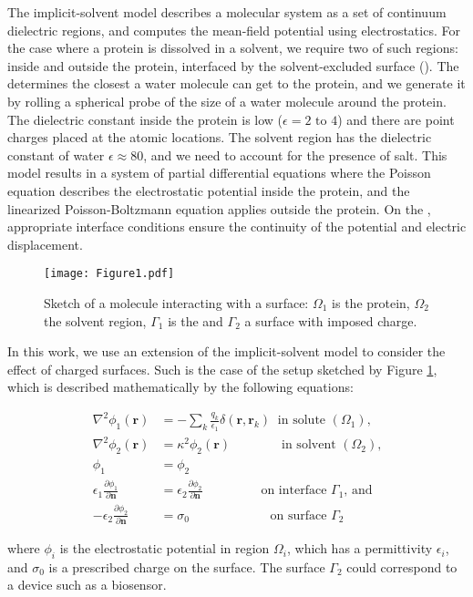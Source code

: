 
The implicit-solvent model describes a molecular system as a set of continuum dielectric regions, and computes the mean-field potential using electrostatics. 
For the case where a protein is dissolved in a solvent, we require two of such regions: inside and outside the protein, interfaced by the solvent-excluded surface (\ses). 
The \ses determines the closest a water molecule can get to the protein, and we generate it by rolling a spherical probe of the size of a water molecule around the protein. 
The dielectric constant inside the protein is low ($\epsilon= 2\text{ to }4$) and there are point charges  placed at the atomic locations. The solvent region has the dielectric constant of water $\epsilon \approx 80$, and we need to account for the presence of salt. 
This model results in a system of partial differential equations where the Poisson equation describes the electrostatic potential inside the protein, and the linearized Poisson-Boltzmann equation applies outside the protein. On the \ses, appropriate interface conditions ensure the continuity of the potential and electric displacement.


\begin{figure}[h]
   \texttt{[image: Figure1.pdf]} 
   \caption{Sketch of a molecule interacting with a surface: $\Omega_1$ is the protein, $\Omega_2$ the solvent region, $\Gamma_1$ is the  \ses and $\Gamma_2$ a surface with imposed charge.}
   \label{fig:molecule_surface}
\end{figure}

In this work, we use an extension of the implicit-solvent model to consider the effect of charged surfaces. Such is the case of the setup sketched by Figure \ref{fig:molecule_surface}, which is described mathematically by the following equations:


\begin{align} \label{eq:pde}
\nabla^2 \phi_1(\mathbf{r}) &= - \sum_k \frac{q_k}{\epsilon_1} \delta(\mathbf{r},\mathbf{r}_k) \ \text{ in solute $(\Omega_1)$,}  \nonumber \\ 
\nabla^2\phi_2 (\mathbf{r}) &= \kappa^2 \phi_2(\mathbf{r}) \quad \qquad \ \ \ \text{ in solvent $(\Omega_2)$,}  \nonumber \\ 
\phi_1 &=\phi_2 \nonumber \\ 
\epsilon_1 \frac{\partial \phi_1}{\partial \mathbf{n}} &= \epsilon_2 \frac{\partial \phi_2}{\partial \mathbf{n}}  \ \qquad \qquad \text{ on interface $\Gamma_1$, and} \nonumber \\
-\epsilon_2 \frac{\partial \phi_2}{\partial \mathbf{n}} &= \sigma_0 \qquad \qquad \qquad \text{ on surface $\Gamma_2$} 
\end{align}

\noindent where $\phi_i$ is the electrostatic potential in region $\Omega_i$, which has a permittivity $\epsilon_i$, and $\sigma_0$ is a prescribed charge on the surface. The surface $\Gamma_2$ could correspond to a device such as a biosensor.

